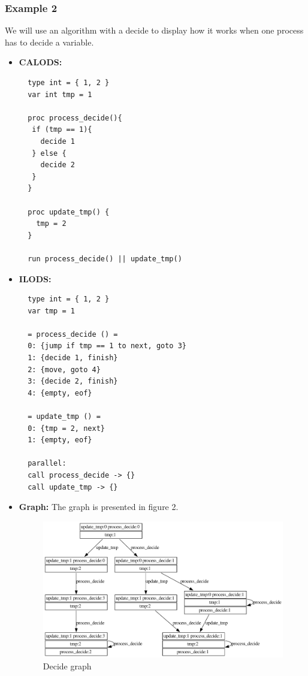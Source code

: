 \documentclass{article}
\begin{document}
\subsubsection{Example 2}
We will use an algorithm with a decide to display how it works when one process has to decide a variable.
\begin{itemize}
  \item \textbf{CALODS:}
  \begin{lstlisting}
  type int = { 1, 2 }
  var int tmp = 1

  proc process_decide(){
   if (tmp == 1){
     decide 1
   } else {
     decide 2
   }
  }

  proc update_tmp() {
    tmp = 2
  }

  run process_decide() || update_tmp()
  \end{lstlisting}

  \item \textbf{ILODS:}
  \begin{lstlisting}
  type int = { 1, 2 }
  var tmp = 1

  = process_decide () =
  0: {jump if tmp == 1 to next, goto 3}
  1: {decide 1, finish}
  2: {move, goto 4}
  3: {decide 2, finish}
  4: {empty, eof}
 
  = update_tmp () =
  0: {tmp = 2, next}
  1: {empty, eof}
 
  parallel:
  call process_decide -> {}
  call update_tmp -> {}  
  \end{lstlisting}

  \item \textbf{Graph:} The graph is presented in figure 2.
  \begin{figure}
    \includegraphics[width=\linewidth]{graphDecide.png}
      \caption{Decide graph}
      \label{fig:decide}
  \end{figure}
\end{itemize}
\end{document}
